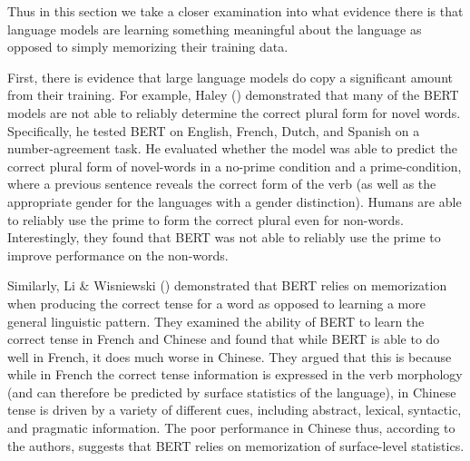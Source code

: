 \documentclass[
  12pt,
  letterpaper,
]{scrreport}
\begin{document}
Thus in this section we take a closer examination into what evidence
there is that language models are learning something meaningful about
the language as opposed to simply memorizing their training data.

First, there is evidence that large language models do copy a
significant amount from their training. For example, Haley
() demonstrated that many of
the BERT models are not able to reliably determine the correct plural
form for novel words. Specifically, he tested BERT on English, French,
Dutch, and Spanish on a number-agreement task. He evaluated whether the
model was able to predict the correct plural form of novel-words in a
no-prime condition and a prime-condition, where a previous sentence
reveals the correct form of the verb (as well as the appropriate gender
for the languages with a gender distinction). Humans are able to
reliably use the prime to form the correct plural even for non-words.
Interestingly, they found that BERT was not able to reliably use the
prime to improve performance on the non-words.

Similarly, Li \& Wisniewski
() demonstrated that BERT
relies on memorization when producing the correct tense for a word as
opposed to learning a more general linguistic pattern. They examined the
ability of BERT to learn the correct tense in French and Chinese and
found that while BERT is able to do well in French, it does much worse
in Chinese. They argued that this is because while in French the correct
tense information is expressed in the verb morphology (and can therefore
be predicted by surface statistics of the language), in Chinese tense is
driven by a variety of different cues, including abstract, lexical,
syntactic, and pragmatic information. The poor performance in Chinese
thus, according to the authors, suggests that BERT relies on
memorization of surface-level statistics.
\end{document}

